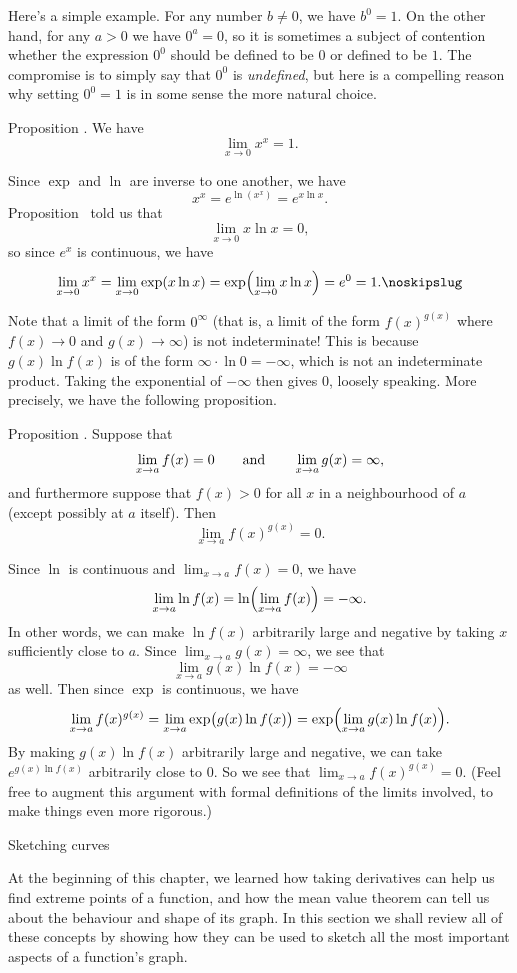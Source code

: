 Here's a simple example. For any number $b\ne 0$, we have $b^0 = 1$. On the other hand, for any $a> 0$
we have $0^a = 0$, so it is sometimes a subject of contention whether the expression $0^0$ should be defined
to be $0$ or defined to be $1$. The compromise is to simply say that $0^0$ is {\it undefined}, but here
is a compelling reason why setting $0^0 = 1$ is in some sense the more natural choice.

\proclaim Proposition \advthm. We have
$$\lim_{x\to 0} x^x = 1.$$

\proof Since $\exp$ and $\ln$ are inverse to one another, we have
$$x^x = e^{\ln(x^x)} = e^{x\ln x}.$$
Proposition~{\propentropylimit} told us that
$$\lim_{x\to 0} x\ln x = 0,$$
so since $e^x$ is continuous, we have
$$\lim_{x\to 0} x^x = \lim_{x\to 0} \exp(x\ln x) = \exp\Bigl( \lim_{x\to 0} x\ln x \Bigr)
= e^0 = 1.\noskipslug$$

Note that a limit of the form $0^\infty$ (that is, a limit of the form $f(x)^{g(x)}$
where $f(x)\to 0$ and $g(x)\to \infty$) is not indeterminate! This is because
$g(x)\ln f(x)$ is of the form $\infty\cdot \ln 0 = -\infty$, which is not an indeterminate product.
Taking the exponential of $-\infty$ then gives $0$, loosely speaking.
More precisely, we have the following proposition.

\proclaim Proposition \advthm. Suppose that
$$\lim_{x\to a} f(x) = 0\qquad\hbox{and}\qquad \lim_{x\to a} g(x) = \infty,$$
and furthermore suppose that $f(x) > 0$ for all $x$ in a neighbourhood of $a$ (except possibly at $a$
itself). Then
$$\lim_{x\to a} f(x)^{g(x)} = 0.$$

\proof Since $\ln$ is continuous and $\lim_{x\to a} f(x) = 0$, we have
$$\lim_{x\to a} \ln f(x) = \ln \Bigl( \lim_{x\to a} f(x) \Bigr) = -\infty.$$
In other words, we can make $\ln f(x)$ arbitrarily large and negative by taking $x$ sufficiently close to $a$.
Since $\lim_{x\to a} g(x) = \infty$, we see that
$$\lim_{x\to a} g(x)\ln f(x) = -\infty$$
as well. Then since $\exp$ is continuous, we have
$$\lim_{x\to a} f(x)^{g(x)}
= \lim_{x\to a} \exp\bigl(g(x)\ln f(x)\bigr)
= \exp\Bigl(\lim_{x\to a} g(x)\ln f(x)\Bigr).$$
By making $g(x)\ln f(x)$ arbitrarily large and negative, we can take $e^{g(x)\ln f(x)}$ arbitrarily close
to $0$. So we see that $\lim_{x\to a} f(x)^{g(x)}  = 0$. (Feel free to augment this argument
with formal definitions of the limits involved, to make things even more rigorous.)\slug

\advsect Sketching curves

At the beginning of this chapter, we learned how taking derivatives can help us find extreme points
of a function, and how the mean value theorem can tell us about the behaviour and shape of its graph.
In this section we shall review all of these concepts by showing how they can be used to sketch all
the most important aspects of a function's graph.

